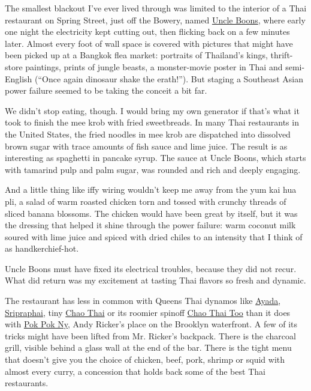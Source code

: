 The smallest blackout I've ever lived through was limited to the
interior of a Thai restaurant on Spring Street, just off the Bowery,
named \href{http://www.uncleboons.com/site/}{Uncle Boons}, where early
one night the electricity kept cutting out, then flicking back on a few
minutes later. Almost every foot of wall space is covered with pictures
that might have been picked up at a Bangkok flea market: portraits of
Thailand's kings, thrift-store paintings, prints of jungle beasts, a
monster-movie poster in Thai and semi-English (``Once again dinosaur
shake the erath!''). But staging a Southeast Asian power failure seemed
to be taking the conceit a bit far.

We didn't stop eating, though. I would bring my own generator if that's
what it took to finish the mee krob with fried sweetbreads. In many Thai
restaurants in the United States, the fried noodles in mee krob are
dispatched into dissolved brown sugar with trace amounts of fish sauce
and lime juice. The result is as interesting as spaghetti in pancake
syrup. The sauce at Uncle Boons, which starts with tamarind pulp and
palm sugar, was rounded and rich and deeply engaging.

And a little thing like iffy wiring wouldn't keep me away from the yum
kai hua pli, a salad of warm roasted chicken torn and tossed with
crunchy threads of sliced banana blossoms. The chicken would have been
great by itself, but it was the dressing that helped it shine through
the power failure: warm coconut milk soured with lime juice and spiced
with dried chiles to an intensity that I think of as handkerchief-hot.

Uncle Boons must have fixed its electrical troubles, because they did
not recur. What did return was my excitement at tasting Thai flavors so
fresh and dynamic.

The restaurant has less in common with Queens Thai dynamos like
\href{http://www.nytimes3xbfgragh.onion/2010/09/08/dining/reviews/08under.html}{Ayada},
\href{http://events.nytimes3xbfgragh.onion/2004/11/03/dining/reviews/03REST.html?pagewanted=all}{Sripraphai},
tiny
\href{http://events.nytimes3xbfgragh.onion/2006/08/16/dining/reviews/16unde.html?fta=y}{Chao
Thai} or its roomier spinoff
\href{http://blogs.villagevoice.com/forkintheroad/2012/10/chao_thai_too_f.php}{Chao
Thai Too} than it does with
\href{http://www.nytimes3xbfgragh.onion/2012/06/27/dining/reviews/pok-pok-ny-brooklyn-restaurant-review.html?pagewanted=all}{Pok
Pok Ny}, Andy Ricker's place on the Brooklyn waterfront. A few of its
tricks might have been lifted from Mr. Ricker's backpack. There is the
charcoal grill, visible behind a glass wall at the end of the bar. There
is the tight menu that doesn't give you the choice of chicken, beef,
pork, shrimp or squid with almost every curry, a concession that holds
back some of the best Thai restaurants.

